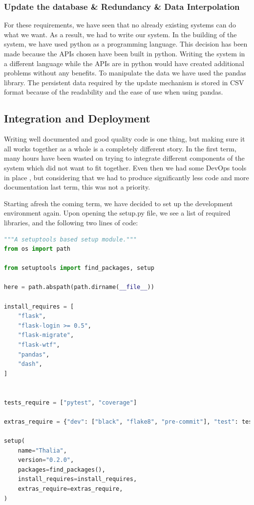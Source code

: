 \documentclass[main.tex]{subfiles}
\begin{document}
\subsubsection*{Update the database \& Redundancy \& Data Interpolation}   
For these requirements, we have seen that no already existing systems can do what we want. As a result, we had to write our system.
In the building of the system, we have used python as a programming language. This decision has been made because the APIs chosen have been built in python. Writing the system in a different language while the APIs are in python would have created additional problems without any benefits.  To manipulate the data we have used the pandas library. The persistent data required by the update mechanism is stored in CSV \cite{csv_iso} format because of the readability and the ease of use when using pandas.

\subsection{Integration and Deployment}
\label{Coding Standards}

 Writing well documented and good quality code is one thing, but making sure it all works together as a whole is a completely different story. In the first term, many hours have been wasted on trying to integrate different components of the system which did not want to fit together. Even then we had some DevOps tools in place \cite{DevOps}, but considering that we had to produce significantly less code and more documentation last term, this was not a priority.

 Starting afresh the coming term, we have decided to set up the development environment again. Upon opening the setup.py file, we see a list of required libraries, and the following two lines of code:

\begin{lstlisting}[language=Python, caption=setup.py - Development environment, label=lst:Development_env]
"""A setuptools based setup module."""
from os import path

from setuptools import find_packages, setup

here = path.abspath(path.dirname(__file__))

install_requires = [
    "flask",
    "flask-login >= 0.5",
    "flask-migrate",
    "flask-wtf",
    "pandas",
    "dash",
]


tests_require = ["pytest", "coverage"]

extras_require = {"dev": ["black", "flake8", "pre-commit"], "test": tests_require}

setup(
    name="Thalia",
    version="0.2.0",
    packages=find_packages(),
    install_requires=install_requires,
    extras_require=extras_require,
)
\end{lstlisting}
\end{document}
